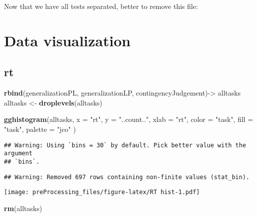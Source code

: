 \documentclass[
]{article}
\newenvironment{Shaded}{\begin{snugshade}}{\end{snugshade}}
\newcommand{\DataTypeTok}[1]{\textcolor[rgb]{0.13,0.29,0.53}{#1}}
\newcommand{\KeywordTok}[1]{\textcolor[rgb]{0.13,0.29,0.53}{\textbf{#1}}}
\newcommand{\NormalTok}[1]{#1}
\newcommand{\StringTok}[1]{\textcolor[rgb]{0.31,0.60,0.02}{#1}}
\begin{document}
Now that we have all tests separated, better to remove this file:

\hypertarget{data-visualization}{%
\section{Data visualization}\label{data-visualization}}

\hypertarget{rt}{%
\subsection{rt}\label{rt}}

\begin{Shaded}
\begin{Highlighting}[]
\KeywordTok{rbind}\NormalTok{(generalizationPL, generalizationLP, contingencyJudgement)->}\StringTok{ }\NormalTok{alltasks}
\NormalTok{alltasks <-}\StringTok{ }\KeywordTok{droplevels}\NormalTok{(alltasks)}
\end{Highlighting}
\end{Shaded}

\begin{Shaded}
\begin{Highlighting}[]
\KeywordTok{gghistogram}\NormalTok{(alltasks,}
       \DataTypeTok{x =} \StringTok{"rt"}\NormalTok{,}
       \DataTypeTok{y =} \StringTok{"..count.."}\NormalTok{,}
       \DataTypeTok{xlab =} \StringTok{"rt"}\NormalTok{, }
       \DataTypeTok{color =} \StringTok{"task"}\NormalTok{, }
       \DataTypeTok{fill =} \StringTok{"task"}\NormalTok{,}
       \DataTypeTok{palette =} \StringTok{"jco"}
\NormalTok{)}
\end{Highlighting}
\end{Shaded}

\begin{verbatim}
## Warning: Using `bins = 30` by default. Pick better value with the argument
## `bins`.
\end{verbatim}

\begin{verbatim}
## Warning: Removed 697 rows containing non-finite values (stat_bin).
\end{verbatim}

\texttt{[image: preProcessing\_files/figure-latex/RT hist-1.pdf]}

\begin{Shaded}
\begin{Highlighting}[]
\KeywordTok{rm}\NormalTok{(alltasks)}
\end{Highlighting}
\end{Shaded}
\end{document}
